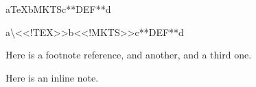 
\mktsShowpar\par
a\TeX{}b{\mktsStyleBold{}MKTS}c**DEF**d\mktsShowpar\par
{\mktsStyleCode{}a\textbackslash{}<<!TEX>>b<<!MKTS>>c**DEF**d}\mktsShowpar\par
Here is a footnote reference, and another,
and a third one.\mktsShowpar\par
Here is an inline note.\mktsShowpar\par

